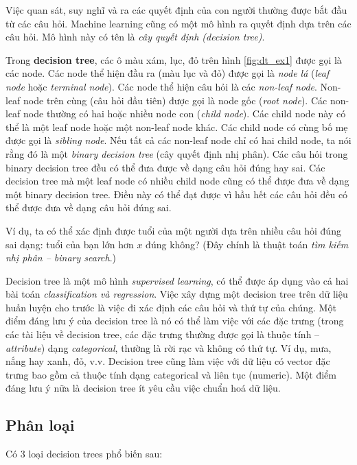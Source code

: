 \documentclass[../main-report.tex]{subfiles}
\begin{document}
Việc quan sát, suy nghĩ và ra các quyết định của con người thường được bắt đầu từ các câu hỏi. Machine learning cũng có một mô hình ra quyết định dựa trên các câu hỏi. Mô hình này có tên là \textit{cây quyết định (decision tree)}.

Trong \textbf{decision tree}, các ô màu xám, lục, đỏ trên hình \ref{fig:dt_ex1} được gọi là các node. Các node thể hiện đầu ra (màu lục và đỏ) được gọi là \textit{node lá} (\textit{leaf node} hoặc \textit{terminal node}). Các node thể hiện câu hỏi là các \textit{non-leaf node}. Non-leaf node trên cùng (câu hỏi đầu tiên) được gọi là node gốc (\textit{root node}). Các non-leaf node thường có hai hoặc nhiều node con (\textit{child node}). Các child node này có thể là một leaf node hoặc một non-leaf node khác. Các child node có cùng bố mẹ được gọi là \textit{sibling node}. Nếu tất cả các non-leaf node chỉ có hai child node, ta nói rằng đó là một \textit{binary decision tree} (cây quyết định nhị phân). Các câu hỏi trong binary decision tree đều có thể đưa được về dạng câu hỏi đúng hay sai. Các decision tree mà một leaf node có nhiều child node cũng có thể được đưa về dạng một binary decision tree. Điều này có thể đạt được vì hầu hết các câu hỏi đều có thể được đưa về dạng câu hỏi đúng sai.

Ví dụ, ta có thể xác định được tuổi của một người dựa trên nhiều câu hỏi đúng sai dạng: tuổi của bạn lớn hơn $x$ đúng không? (Đây chính là thuật toán \textit{tìm kiếm nhị phân – binary search}.)

Decision tree là một mô hình \textit{supervised learning}, có thể được áp dụng vào cả hai bài toán \textit{classification và regression}. Việc xây dựng một decision tree trên dữ liệu huấn luyện cho trước là việc đi xác định các câu hỏi và thứ tự của chúng. Một điểm đáng lưu ý của decision tree là nó có thể làm việc với các đặc trưng (trong các tài liệu về decision tree, các đặc trưng thường được gọi là thuộc tính – \textit{attribute}) dạng \textit{categorical}, thường là rời rạc và không có thứ tự. Ví dụ, mưa, nắng hay xanh, đỏ, v.v. Decision tree cũng làm việc với dữ liệu có vector đặc trưng bao gồm cả thuộc tính dạng categorical và liên tục (numeric). Một điểm đáng lưu ý nữa là decision tree ít yêu cầu việc chuẩn hoá dữ liệu.

\subsection{Phân loại}
Có 3 loại decision trees phổ biến sau:
\end{document}
